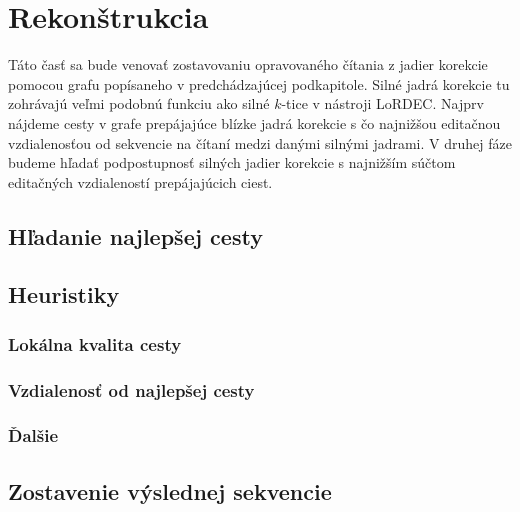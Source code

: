 \section{Rekonštrukcia}

Táto časť sa bude venovať zostavovaniu opravovaného čítania z jadier korekcie pomocou grafu popísaneho v predchádzajúcej podkapitole. Silné jadrá korekcie tu zohrávajú veľmi podobnú funkciu ako silné $k$-tice v nástroji LoRDEC. Najprv nájdeme cesty v grafe prepájajúce blízke jadrá korekcie s čo najnižšou editačnou vzdialenosťou od sekvencie na čítaní medzi danými silnými jadrami. V druhej fáze budeme hľadať podpostupnosť silných jadier korekcie s najnižším súčtom editačných vzdialeností prepájajúcich ciest.

\subsection{Hľadanie najlepšej cesty}

\subsection{Heuristiky}

\subsubsection{Lokálna kvalita cesty}

\subsubsection{Vzdialenosť od najlepšej cesty}

\subsubsection{Ďalšie}

\subsection{Zostavenie výslednej sekvencie}